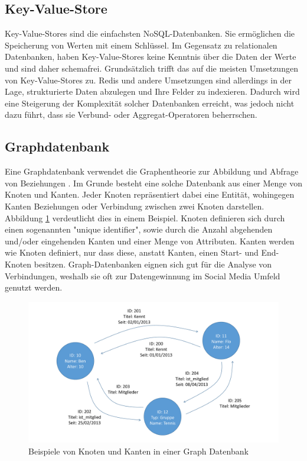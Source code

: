 \subsection{Key-Value-Store}
\label{ch:grundlagen:sec:NoSQL:KeyValueStore}

Key-Value-Stores sind die einfachsten NoSQL-Datenbanken. Sie ermöglichen die Speicherung von Werten mit einem Schlüssel. Im Gegensatz zu relationalen Datenbanken, haben Key-Value-Stores keine Kenntnis über die Daten der Werte und sind daher schemafrei. Grundsätzlich trifft das auf die meisten Umsetzungen von Key-Value-Stores zu. Redis und andere Umsetzungen sind allerdings in der Lage, strukturierte Daten abzulegen und Ihre Felder zu indexieren. Dadurch wird eine Steigerung der Komplexität solcher Datenbanken erreicht, was jedoch nicht dazu führt, dass sie Verbund- oder Aggregat-Operatoren beherrschen. 

\subsection{Graphdatenbank}
\label{ch:grundlagen:sec:NoSQL:GraphDatenbanken}

Eine Graphdatenbank verwendet die Graphentheorie zur Abbildung und Abfrage von Beziehungen \cite{SWB-386976589}. Im Grunde besteht eine solche Datenbank aus einer Menge von Knoten und Kanten. Jeder Knoten repräsentiert dabei eine Entität, wohingegen Kanten Beziehungen oder Verbindung zwischen zwei Knoten darstellen. Abbildung \ref{graph_database} verdeutlicht dies in einem Beispiel. Knoten definieren sich durch einen sogenannten "unique identifier", sowie durch die Anzahl abgehenden und/oder eingehenden Kanten und einer Menge von Attributen. Kanten werden wie Knoten definiert, nur dass diese, anstatt Kanten, einen Start- und End-Knoten besitzen. Graph-Datenbanken eignen sich gut für die Analyse von Verbindungen, weshalb sie oft zur Datengewinnung im Social Media Umfeld genutzt werden.

\begin{figure}[htbp]
	\centering
  \includegraphics[width=1.0\textwidth, width=1.0\textwidth]{pics/graphdatabase.pdf}
	\caption{Beispiele von Knoten und Kanten in einer Graph Datenbank}
	\label{graph_database}
\end{figure}


